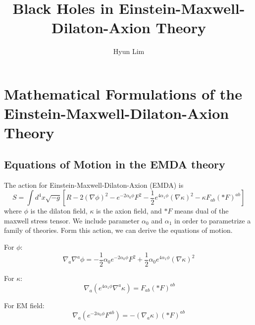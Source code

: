 \documentclass[prd]{revtex4}
\begin{document}
\title{Black Holes in Einstein-Maxwell-Dilaton-Axion Theory}

\author{Hyun Lim}


\maketitle

\section{Mathematical Formulations of the Einstein-Maxwell-Dilaton-Axion Theory}

\subsection{Equations of Motion in the EMDA theory}

The action for Einstein-Maxwell-Dilaton-Axion (EMDA) is
\begin{equation}
S=\int d^4 x \sqrt{-g} \left[R - 2 (\nabla \phi)^2 - e^{-2 \alpha_0 \phi} F^2 -\frac{1}{2} e^{4 \alpha_1 \phi} (\nabla \kappa)^2 - \kappa F_{ab} ( \ast  F )^{ab} \right]
\end{equation}
where $\phi$ is the dilaton field, $\kappa$ is the axion field, and $\ast F$ means dual of the maxwell stress tensor. We include parameter $\alpha_0$ and $\alpha_1$ in order to parametrize a family of theories. Form this action, we can derive the equations of motion. 

For $\phi$:
\begin{equation}
\nabla_a \nabla^a \phi = -\frac{1}{2} \alpha_0 e^{-2 \alpha_0 \phi} F^2 + \frac{1}{2} \alpha_0 e^{4 \alpha_1 \phi} (\nabla \kappa)^2
\end{equation}

For $\kappa$:
\begin{equation}\
\nabla_a \left(e^{4 \alpha_1 \phi} \nabla^a \kappa \right) = F_{ab} (\ast F)^{ab}
\end{equation}

For EM field:
\begin{equation}
\nabla_a \left(e^{-2 \alpha_0 \phi} F^{ab}\right) = - (\nabla_a \kappa) (\ast F)^{ab}
\end{equation}
\end{document}

